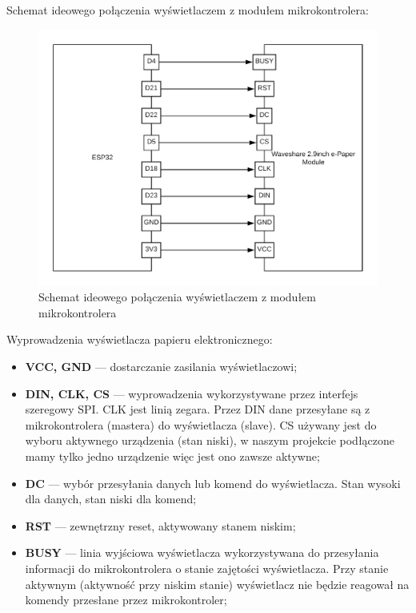 \documentclass[a4paper,12pt, twoside]{article}
\begin{document}
\begin{enumerate}
            Schemat ideowego połączenia wyświetlaczem z modułem mikrokontrolera:
            \begin{figure}[H]
    	        \centering
    			\includegraphics[width=12cm]{images/schemat_polaczenia_mikro_z_wyswietlaczem.png}
    			\caption{Schemat ideowego połączenia wyświetlaczem z modułem mikrokontrolera}
                \label{fig:polecznie_mikro_z_epapierem}
    	    \end{figure}
        
            Wyprowadzenia  wyświetlacza papieru elektronicznego: 
            \begin{itemize}
                \item \textbf{VCC, GND} — dostarczanie zasilania wyświetlaczowi;
                \item \textbf{DIN, CLK, CS} — wyprowadzenia wykorzystywane przez interfejs szeregowy SPI. CLK jest linią zegara. Przez DIN dane przesyłane są z mikrokontrolera (mastera) do wyświetlacza (slave). CS używany jest do wyboru aktywnego urządzenia (stan niski), w naszym projekcie podłączone mamy tylko jedno urządzenie więc jest ono zawsze aktywne;
                \item \textbf{DC} — wybór przesyłania danych lub komend do wyświetlacza. Stan wysoki dla danych, stan niski dla komend;
                \item \textbf{RST} — zewnętrzny reset, aktywowany stanem niskim;
                \item \textbf{BUSY}  — linia wyjściowa wyświetlacza wykorzystywana do przesyłania informacji do mikrokontrolera o stanie zajętości wyświetlacza. Przy stanie aktywnym (aktywność przy niskim stanie) wyświetlacz nie będzie reagował na komendy przesłane przez mikrokontroler; 
            \end{itemize}
        \end{enumerate}
        
\end{document}
